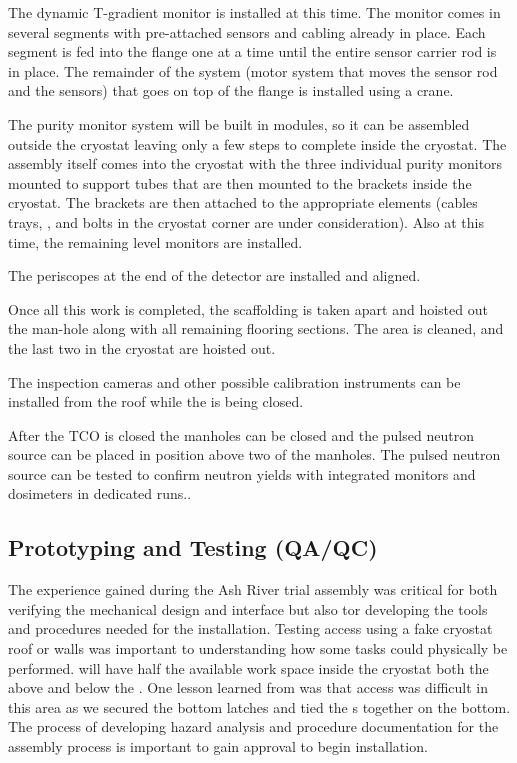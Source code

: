 The dynamic T-gradient monitor is installed at this time. 
The monitor comes in several segments with pre-attached sensors and cabling already in place. Each segment is fed into the flange one at a time until the entire sensor carrier rod is in place. The remainder of the system (motor system that moves the sensor rod and the sensors) that goes on top of the flange is installed using a crane. 

The purity monitor system will be built in modules, so it can be assembled outside the cryostat leaving only a few steps to complete inside the cryostat. 
The assembly itself comes into the cryostat with the three individual purity monitors mounted to support tubes that are then mounted to the brackets inside the cryostat. The brackets are then attached to the appropriate elements (cables trays, , and bolts in the cryostat corner are under consideration). Also at this time, the remaining level monitors are installed.

The periscopes at the end of the detector are installed and aligned. 

Once all this work is completed, the scaffolding is taken apart and hoisted out the man-hole along with all remaining flooring sections. The area is cleaned, and the last two  in the cryostat are hoisted out. 

The inspection cameras and other possible calibration instruments can be installed from the roof while the  is being closed.

After the TCO is closed the manholes can be closed and the pulsed neutron source can be placed in position above two of the manholes. The pulsed neutron source can be tested to confirm neutron yields with integrated monitors and dosimeters in dedicated runs..





\subsection{Prototyping and Testing (QA/QC)}
\label{sec:fdsp-tc-inst-qaqc}

The experience gained during the  Ash River trial assembly was critical for both verifying the mechanical design and interface but also tor developing the tools and procedures needed for the installation.
Testing access using a fake cryostat roof or walls was important to understanding how some tasks could physically be performed. 
 will have half the available work space inside the cryostat both the above and below the .  One lesson learned from  was that access was difficult in this area as we secured the bottom latches and tied the s together on the bottom.  The process of developing hazard analysis and procedure documentation for the assembly process is important to gain approval to begin installation.   

